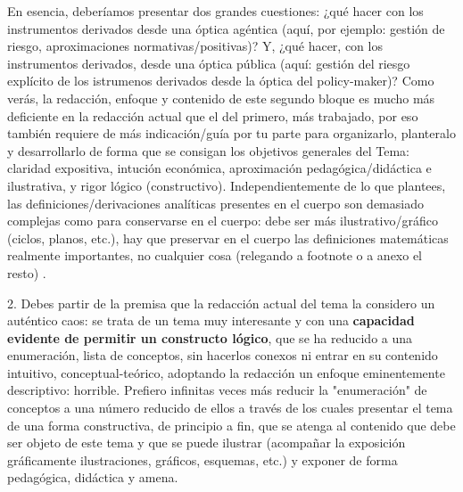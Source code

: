 \documentclass[10pt,a4paper]{article}
\newcounter{anexo}
\begin{document}
{{    En esencia, deberíamos presentar dos grandes cuestiones: ¿qué hacer con los instrumentos derivados desde una óptica agéntica (aquí, por ejemplo: gestión de riesgo, aproximaciones normativas/positivas)? Y, ¿qué hacer, con los instrumentos derivados, desde una óptica pública (aquí: gestión del riesgo explícito de los istrumenos derivados desde la óptica del policy-maker)? 
    Como verás, la redacción, enfoque y contenido de este segundo bloque es mucho más deficiente en la redacción actual que el del primero, más trabajado, por eso también requiere de más indicación/guía por tu parte para organizarlo, planteralo y desarrollarlo de forma que se consigan los objetivos generales del Tema: claridad expositiva, intución económica, aproximación pedagógica/didáctica e ilustrativa, y rigor lógico (constructivo). 
    Independientemente de lo que plantees, las definiciones/derivaciones analíticas presentes en el cuerpo son demasiado complejas como para conservarse en el cuerpo: debe ser más ilustrativo/gráfico (ciclos, planos, etc.), hay que preservar en el cuerpo las definiciones matemáticas realmente importantes, no cualquier cosa (relegando a footnote o a anexo el resto) . 
    
    2. Debes partir de la premisa que la redacción actual del tema la considero un auténtico caos: se trata de un tema muy interesante y con una \textbf{capacidad evidente de permitir un constructo lógico}, que se ha reducido a una enumeración, lista de conceptos, sin hacerlos conexos ni entrar en su contenido intuitivo, conceptual-teórico, adoptando la redacción un enfoque eminentemente descriptivo: horrible. 
    Prefiero infinitas veces más reducir la "enumeración" de conceptos a una número reducido de ellos a través de los cuales presentar el tema de una forma constructiva, de principio a fin, que se atenga al contenido que debe ser objeto de este tema y que se puede ilustrar (acompañar la exposición gráficamente ilustraciones, gráficos, esquemas, etc.) y exponer de forma pedagógica, didáctica y amena.

}}
\end{document}
